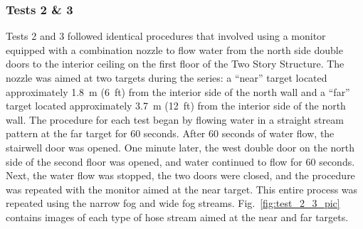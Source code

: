 \documentclass[12pt,oneside]{book}
\begin{document}
\subsubsection{Tests 2 \& 3}
Tests 2 and 3 followed identical procedures that involved using a monitor equipped with a combination nozzle to flow water from the north side double doors to the interior ceiling on the first floor of the Two Story Structure. The nozzle was aimed at two targets during the series: a ``near'' target located approximately 1.8~m (6~ft) from the interior side of the north wall and a ``far'' target located approximately 3.7~m (12~ft) from the interior side of the north wall. The procedure for each test began by flowing water in a straight stream pattern at the far target for 60 seconds. After 60 seconds of water flow, the stairwell door was opened. One minute later, the west double door on the north side of the second floor was opened, and water continued to flow for 60 seconds. Next, the water flow was stopped, the two doors were closed, and the procedure was repeated with the monitor aimed at the near target. This entire process was repeated using the narrow fog and wide fog streams. Fig.~\ref{fig:test_2_3_pic} contains images of each type of hose stream aimed at the near and far targets.
\end{document}

